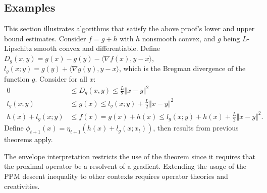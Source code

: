 \documentclass[12pt]{article}
\begin{document}
    \subsection{Examples}
        \begin{example}
            This section illustrates algorithms that satisfy the above proof's lower and upper bound estimates. 
            Consider $f = g + h$ with $h$ nonsmooth convex, and $g$ being $L$-Lipschitz smooth convex and differentiable. 
            Define $D_g(x, y) = g(x) - g(y) - \langle \nabla f(x), y - x\rangle$, $l_g(x; y) = g(y) + \langle \nabla g(y), y - x\rangle$, which is the Bregman divergence of the function $g$. 
            Consider for all $x$: 
            \begin{align*}
                0 & \le 
                D_g (x, y) \le  \frac{L}{2} \Vert x - y\Vert^2 
                \\
                l_g (x; y) &\le 
                g(x) 
                \le l_g(x; y) + \frac{L}{2} \Vert x - y\Vert^2 
                \\
                h(x) + l_g(x; y) &\le f(x) = g(x) + h(x)
                \le 
                l_g(x; y) + h(x) + \frac{L}{2}\Vert x - y\Vert^2. 
            \end{align*}
            Define $\phi_{t + 1} (x) = \eta_{t + 1}(h(x) + l_g(x; x_t))$, then results from previous theorems apply.    
        \end{example}
        \begin{remark}
            The envelope interpretation restricts the use of the theorem since it requires that the proximal operator be a resolvent of a gradient. 
            Extending the usage of the PPM descent inequality to other contexts requires operator theories and creativities. 
        \end{remark}
\end{document}
